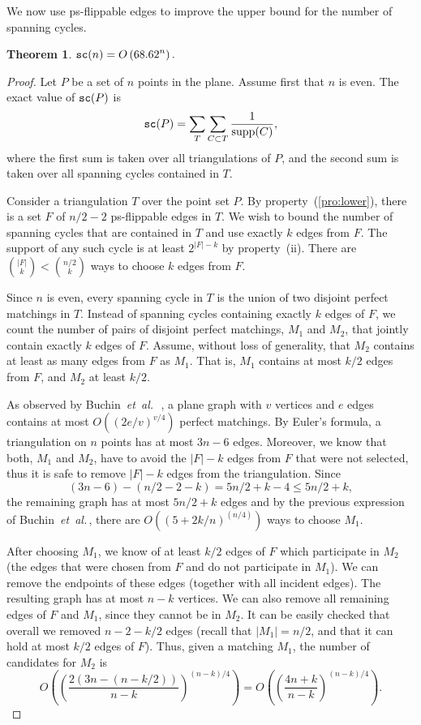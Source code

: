 \documentclass[11pt]{article}
\newtheorem{theorem}{Theorem}
\def\etal{{\it et~al.}\,}
\newcommand{\supp}{{\rm supp}}
\def\sc{{\tt sc}}
\begin{document}
We now use ps-flippable edges to improve the upper bound for the
number of spanning cycles.
\begin{theorem}\label{thm:polygonize}\label{th:triVSsc}
$\displaystyle \sc(n) = O \left(68.62^n \right). $
\end{theorem}
\begin{proof}
Let $P$ be a set of $n$ points in the plane. Assume first that $n$ is even.
The exact value of $\sc(P)$ is
\begin{equation} \label{eq:optimal}
\sc(P) = \sum_{T} \sum_{C \subset T} \frac{1}{\supp(C)},
\end{equation}
where the first sum is taken over all triangulations of $P$, and the second sum is
taken over all spanning cycles contained in $T$.

Consider a triangulation $T$ over the point set $P$. By property~(\ref{pro:lower}),
there is a set $F$ of $n/2-2$ ps-flippable edges in $T$. We wish to bound the number
of spanning cycles that are contained in $T$ and use exactly $k$ edges from $F$.
The support of any such cycle is at least $2^{|F|-k}$ by property~(ii).
There are $\binom{|F|}{k}<\binom{n/2}{k}$ ways to choose $k$ edges from $F$.

Since $n$ is even, every spanning cycle in $T$ is the union of two
disjoint perfect matchings in $T$. Instead of spanning cycles containing
exactly $k$ edges of $F$, we count the number of pairs of disjoint
perfect matchings, $M_1$ and $M_2$, that jointly contain exactly $k$ edges of
$F$. Assume, without loss of generality, that $M_2$ contains at least as
many edges from $F$ as $M_1$.
That is, $M_1$ contains at most $k/2$ edges from $F$, and $M_2$ at least $k/2$.

As observed by Buchin~\etal~\cite{BKK+07}, a plane graph with $v$
vertices and $e$ edges contains at most $O(( 2e/v )^{v/4})$ perfect
matchings. By Euler's formula,
a triangulation on $n$ points has at most $3n - 6$ edges.
Moreover, we know that both, $M_1$ and $M_2$, have to avoid the $|F|-k$
edges from $F$ that were not selected, thus it is safe to remove
$|F|-k$ edges from the triangulation. Since
$$ (3n-6)-(n/2-2-k)=5n/2+k-4 \leq 5n/2+k, $$
the remaining graph has at most $5n/2+k$
edges and by the previous expression of Buchin~\etal, there are
$O\left((5+2k/n)^{(n/4)}\right)$ ways to choose $M_1$.

After choosing $M_1$, we know of at least $k/2$ edges of $F$ which
participate in $M_2$ (the edges that were chosen from $F$ and do not participate in $M_1$).
We can remove the endpoints of these edges (together with all
incident edges). The resulting graph has at most $n-k$ vertices. We can also remove
all remaining edges of $F$ and $M_1$, since they cannot be in $M_2$. It can be easily
checked that overall we removed $n-2-k/2$ edges (recall that $|M_1| = n/2$,
and that it can hold at most $k/2$ edges of $F$). Thus, given a
matching $M_1$, the number of candidates for $M_2$ is
$$ O\left(\left( \frac{2(3n-(n-k/2))}{n-k} \right)^{(n-k)/4} \right)
= O\left(\left( \frac{4n+k}{n-k} \right)^{(n-k)/4} \right) .$$


\end{proof}
\end{document}
